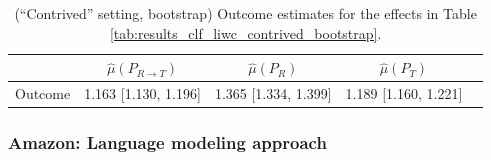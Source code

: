 \documentclass{article}
\begin{document}
\begin{table}[!ht]
\centering
\begin{tabular}{c|cccc}
\toprule
    & $\hat{\mu}(P_{R \rightarrow T})$   & $\hat{\mu}(P_R)$     & $\hat{\mu}(P_T)$     \\
\midrule
    Outcome & 1.163 [1.130, 1.196]               & 1.365 [1.334, 1.399] & 1.189 [1.160, 1.221] \\
\bottomrule
\end{tabular}
\caption{(``Contrived'' setting, bootstrap) Outcome estimates for the effects in Table \ref{tab:results_clf_liwc_contrived_bootstrap}.}
\label{tab:results_clf_liwc_contrived_bootstrap_outcome}
\end{table}

\newpage
\subsubsection{Amazon: Language modeling approach}
\end{document}
